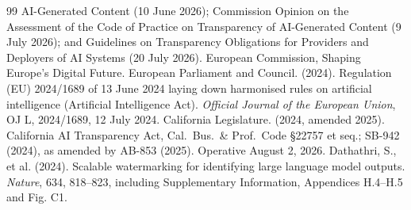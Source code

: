 \documentclass[11pt]{article}
\begin{document}
\begin{thebibliography}{99}
AI-Generated Content (10 June 2026); Commission Opinion on the Assessment of the
Code of Practice on Transparency of AI-Generated Content (9 July 2026); and
Guidelines on Transparency Obligations for Providers and Deployers of AI Systems
(20 July 2026). European Commission, Shaping Europe's Digital Future.
 European Parliament and Council. (2024). Regulation (EU)
2024/1689 of 13 June 2024 laying down harmonised rules on artificial intelligence
(Artificial Intelligence Act). \emph{Official Journal of the European Union}, OJ L,
2024/1689, 12 July 2024.
 California Legislature. (2024, amended 2025). California AI
Transparency Act, Cal.\ Bus.\ \& Prof.\ Code \S22757 et seq.; SB-942 (2024), as
amended by AB-853 (2025). Operative August 2, 2026.
 Dathathri, S., et al. (2024). Scalable watermarking
for identifying large language model outputs. \emph{Nature}, 634, 818--823,
including Supplementary Information, Appendices H.4--H.5 and Fig. C1.
\end{thebibliography}
\end{document}
